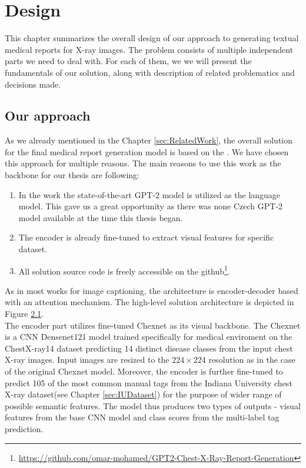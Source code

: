 \chapter{Design}
This chapter summarizes the overall design of our approach to generating textual medical reports for X-ray images. The problem consists of multiple independent parts we need to deal with. For each of them, we we will present the fundamentals of our solution, along with description of related problematics and decisions made.

\section{Our approach}
As we already mentioned in the Chapter \ref{sec:RelatedWork}, the overall solution for the final medical report generation model is based on the \citet{alfarghaly2021automated}. We have chosen this approach for multiple reasons. The main reasons to use this work as the backbone for our thesis are following:
\begin{enumerate}
	\item In the work the state-of-the-art GPT-2 model is utilized as the language model. This gave us a great opportunity as there was none Czech GPT-2 model available at the time this thesis began.
	\item The encoder is already fine-tuned to extract visual features for specific dataset.
	\item All solution source code is freely accessible on the github\footnote[1]{\url{https://github.com/omar-mohamed/GPT2-Chest-X-Ray-Report-Generation}}.
\end{enumerate}

As in most works for image captioning, the architecture is encoder-decoder based with an attention mechanism. The high-level solution architecture is depicted in Figure \hyperref[fig01:OmarArchitecutre]{2.1}.\\

The encoder part utilizes fine-tuned Chexnet\citep{rajpurkar2017chexnet} as its visual backbone. The Chexnet is a CNN Densenet121 model trained specifically for medical enviroment on the ChestX-ray14\citep{wang2017chestx} dataset predicting 14 distinct disease classes from the input chest X-ray images. Input images are resized to the $224 \times 224$ resolution as in the case of the original Chexnet model. Moreover, the encoder is further fine-tuned to predict 105 of the most common manual tags from the Indiana University chest X-ray dataset(see Chapter \ref{sec:IUDataset}) for the purpose of wider range of possible semantic features. The model thus produces two types of outputs - visual features from the base CNN model and class scores from the multi-label tag prediction.\\

